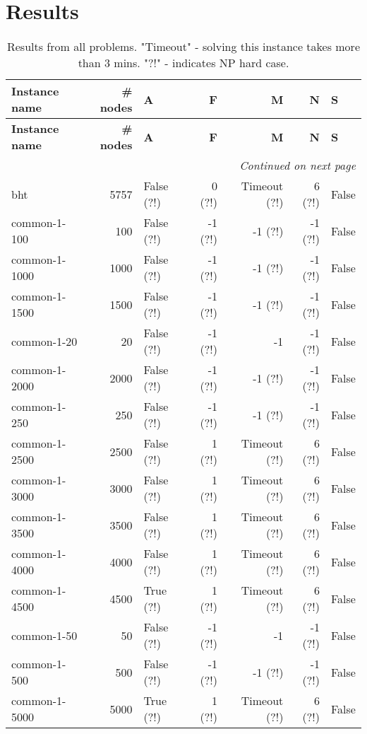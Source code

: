 \section{Results}
\begin{longtable}{lrlrrrl} \caption{Results from all problems. \n "Timeout" - solving this instance takes more than 3 mins. "?!" - indicates NP hard case.}\label{table:results} \toprule  \textbf{Instance name}& \textbf{\# nodes}& \textbf{A}& \textbf{F}& \textbf{M}& \textbf{N}& \textbf{S}\\
\midrule
\endfirsthead
\toprule
 \textbf{Instance name}& \textbf{\# nodes}& \textbf{A}& \textbf{F}& \textbf{M}& \textbf{N}& \textbf{S}\\
\midrule
\endhead
\midrule
\multicolumn{7}{r}{\textit{Continued on next page}} \\
\midrule
\endfoot
\bottomrule
\endlastfoot
bht & 5757 & False (?!) & 0 (?!) & Timeout (?!) & 6 (?!) & False \\
common-1-100 & 100 & False (?!) & -1 (?!) & -1 (?!) & -1 (?!) & False \\
common-1-1000 & 1000 & False (?!) & -1 (?!) & -1 (?!) & -1 (?!) & False \\
common-1-1500 & 1500 & False (?!) & -1 (?!) & -1 (?!) & -1 (?!) & False \\
common-1-20 & 20 & False (?!) & -1 (?!) & -1 & -1 (?!) & False \\
common-1-2000 & 2000 & False (?!) & -1 (?!) & -1 (?!) & -1 (?!) & False \\
common-1-250 & 250 & False (?!) & -1 (?!) & -1 (?!) & -1 (?!) & False \\
common-1-2500 & 2500 & False (?!) & 1 (?!) & Timeout (?!) & 6 (?!) & False \\
common-1-3000 & 3000 & False (?!) & 1 (?!) & Timeout (?!) & 6 (?!) & False \\
common-1-3500 & 3500 & False (?!) & 1 (?!) & Timeout (?!) & 6 (?!) & False \\
common-1-4000 & 4000 & False (?!) & 1 (?!) & Timeout (?!) & 6 (?!) & False \\
common-1-4500 & 4500 & True (?!) & 1 (?!) & Timeout (?!) & 6 (?!) & False \\
common-1-50 & 50 & False (?!) & -1 (?!) & -1 & -1 (?!) & False \\
common-1-500 & 500 & False (?!) & -1 (?!) & -1 (?!) & -1 (?!) & False \\
common-1-5000 & 5000 & True (?!) & 1 (?!) & Timeout (?!) & 6 (?!) & False \\

\end{longtable}
